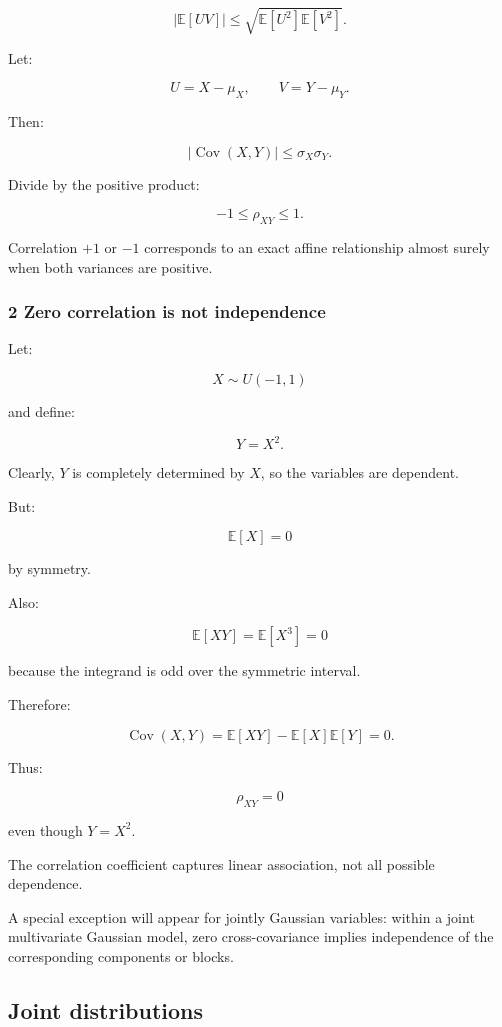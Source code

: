 \[
 |\mathbb E[UV]| \le \sqrt{\mathbb E[U^2]\mathbb E[V^2]}.
\]

Let:

\[
 U=X-\mu_X, \qquad V=Y-\mu_Y.
\]

Then:

\[
 |\operatorname{Cov}(X,Y)| \le \sigma_X\sigma_Y.
\]

Divide by the positive product:

\[
 \boxed{ -1\le\rho_{XY}\le1 }.
\]

Correlation \(+1\) or \(-1\) corresponds to an exact affine relationship almost surely when both variances are positive.

\subsubsection{2 Zero correlation is not independence}\label{02-foundations-ii-ch023-zero-correlation-is-not-independence}

\hypertarget{02-foundations-ii-ch023-zero-correlation-is-not-independence}{}

Let:

\[
 X\sim U(-1,1)
\]

and define:

\[
 Y=X^2.
\]

Clearly, \(Y\) is completely determined by \(X\), so the variables are dependent.

But:

\[
 \mathbb E[X]=0
\]

by symmetry.

Also:

\[
 \mathbb E[XY] = \mathbb E[X^3]=0
\]

because the integrand is odd over the symmetric interval.

Therefore:

\[
 \operatorname{Cov}(X,Y) = \mathbb E[XY]-\mathbb E[X]\mathbb E[Y] =0.
\]

Thus:

\[
 \boxed{\rho_{XY}=0}
\]

even though \(Y=X^2\).

The correlation coefficient captures linear association, not all possible dependence.

A special exception will appear for jointly Gaussian variables: within a joint multivariate Gaussian model, zero cross-covariance implies independence of the corresponding components or blocks.

\subsection{Joint distributions}\label{02-foundations-ii-ch023-joint-distributions}

